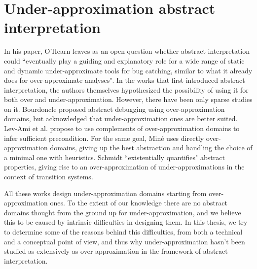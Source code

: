 \section{Under-approximation abstract interpretation}
In his paper, O'Hearn leaves as an open question whether abstract interpretation could ``eventually play a guiding and explanatory role for a wide range of static and dynamic under-approximate tools for bug catching, similar to what it already does for over-approximate analyses".
In the works that first introduced abstract interpretation, the authors themselves hypothesized the possibility of using it for both over and under-approximation. However, there have been only sparse studies on it.
Bourdoncle \cite{bourdoncle-abs-debugging} proposed abstract debugging using over-approximation domains, but acknowledged that under-approximation ones are better suited.
Lev-Ami et al. \cite{lev-backward-analysis-complement} propose to use complements of over-approximation domains to infer sufficient precondition.
For the same goal, Miné \cite{mine-backward-underapprox-14} uses directly over-approximation domains, giving up the best abstraction and handling the choice of a minimal one with heuristics.
Schmidt \cite{schmidt-higher-order-approx-2007} ``existentially quantifies" abstract properties, giving rise to an over-approximation of under-approximations in the context of transition systems.

All these works design under-approximation domains starting from over-approximation ones. To the extent of our knowledge there are no abstract domains thought from the ground up for under-approximation, and we believe this to be caused by intrinsic difficulties in designing them. In this thesis, we try to determine some of the reasons behind this difficulties, from both a technical and a conceptual point of view, and thus why under-approximation hasn't been studied as extensively as over-approximation in the framework of abstract interpretation.

